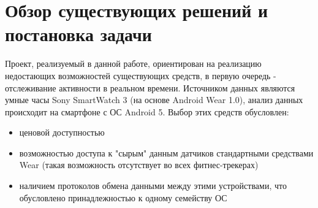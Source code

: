 \chapter{Обзор существующих решений и постановка задачи}



Проект, реализуемый в данной работе, ориентирован на реализацию недостающих возможностей существующих средств, в первую очередь - отслеживание активности в реальном времени. Источником данных являются умные часы Sony SmartWatch 3 (на основе Android Wear 1.0), анализ данных происходит на смартфоне с ОС Android 5. Выбор этих средств обусловлен:
\begin{itemize}
\item ценовой доступностью
\item возможностью доступа к "сырым" данным датчиков стандартными средствами Wear (такая возможность отсутствует во всех фитнес-трекерах)
\item наличием протоколов обмена данными между этими устройствами, что обусловлено принадлежностью к одному семейству ОС
\end{itemize}

